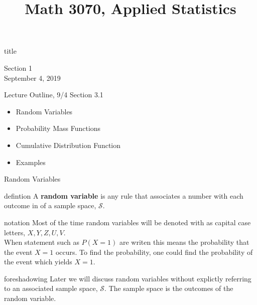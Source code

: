 \documentclass[handout]{beamer}
\title{Math 3070, Applied Statistics}
\newcommand{\nl}[1]{\vspace{#1 em}}
\begin{document}
\begin{frame}
    \begin{beamercolorbox}[rounded=true,wd=\textwidth,center]{title}
        \inserttitle
    \end{beamercolorbox}
    \begin{center}
        Section 1\\
        \nl{0.5}
        September 4, 2019
    \end{center}

\end{frame}

\begin{frame}{Lecture Outline, 9/4}
    Section 3.1
    \begin{itemize}
        \item Random Variables
        \item Probability Mass Functions
        \item Cumulative Distribution Function
        \item Examples
    \end{itemize}
\end{frame}

\begin{frame}{Random Variables}
    \begin{block}{defintion}
    A \textbf{random variable} is any rule that associates a number with each outcome in of a sample space, $\mathcal{S}$.
    \end{block}
    \begin{block}{notation}
        Most of the time random variables will be denoted with as capital case letters, $X,Y,Z,U,V$.\\
        \nl{0.5}
        When statement such as  $P(X=1)$ are writen this means the probability that the event $X=1$ occurs. To find the probability, one could find the probability of the event which yields $X=1$.
    \end{block}
    \begin{block}{foreshadowing}
        Later we will discuss random variables without explictly referring to an associated sample space, $\mathcal{S}$. The sample space is the outcomes of the random variable.
    \end{block}
\end{frame}
\end{document}
